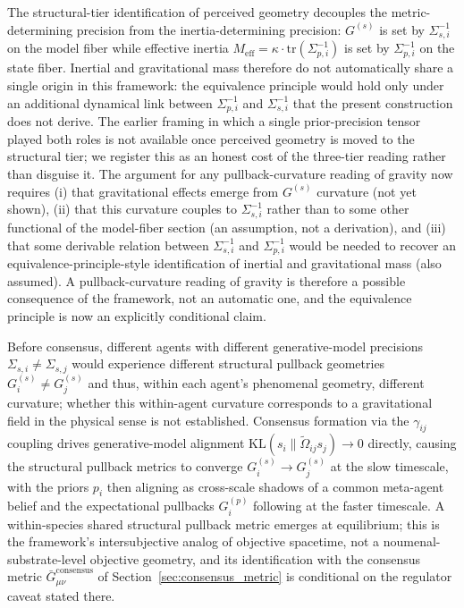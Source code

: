 \documentclass[11pt]{article}
\begin{document}
The structural-tier identification of perceived geometry decouples the metric-determining precision from the inertia-determining precision: $G^{(s)}$ is set by $\Sigma_{s,i}^{-1}$ on the model fiber while effective inertia $M_{\text{eff}} = \kappa \cdot \mathrm{tr}(\Sigma_{p,i}^{-1})$ is set by $\Sigma_{p,i}^{-1}$ on the state fiber. Inertial and gravitational mass therefore do not automatically share a single origin in this framework: the equivalence principle would hold only under an additional dynamical link between $\Sigma_{p,i}^{-1}$ and $\Sigma_{s,i}^{-1}$ that the present construction does not derive. The earlier framing in which a single prior-precision tensor played both roles is not available once perceived geometry is moved to the structural tier; we register this as an honest cost of the three-tier reading rather than disguise it. The argument for any pullback-curvature reading of gravity now requires (i) that gravitational effects emerge from $G^{(s)}$ curvature (not yet shown), (ii) that this curvature couples to $\Sigma_{s,i}^{-1}$ rather than to some other functional of the model-fiber section (an assumption, not a derivation), and (iii) that some derivable relation between $\Sigma_{s,i}^{-1}$ and $\Sigma_{p,i}^{-1}$ would be needed to recover an equivalence-principle-style identification of inertial and gravitational mass (also assumed). A pullback-curvature reading of gravity is therefore a possible consequence of the framework, not an automatic one, and the equivalence principle is now an explicitly conditional claim.

Before consensus, different agents with different generative-model precisions $\Sigma_{s,i} \neq \Sigma_{s,j}$ would experience different structural pullback geometries $G^{(s)}_i \neq G^{(s)}_j$ and thus, within each agent's phenomenal geometry, different curvature; whether this within-agent curvature corresponds to a gravitational field in the physical sense is not established. Consensus formation via the $\gamma_{ij}$ coupling drives generative-model alignment $\mathrm{KL}(s_i\|\tilde\Omega_{ij}s_j) \to 0$ directly, causing the structural pullback metrics to converge $G^{(s)}_i \to G^{(s)}_j$ at the slow timescale, with the priors $p_i$ then aligning as cross-scale shadows of a common meta-agent belief and the expectational pullbacks $G^{(p)}_i$ following at the faster timescale. A within-species shared structural pullback metric emerges at equilibrium; this is the framework's intersubjective analog of objective spacetime, not a noumenal-substrate-level objective geometry, and its identification with the consensus metric $\bar{G}_{\mu\nu}^{\text{consensus}}$ of Section~\ref{sec:consensus_metric} is conditional on the regulator caveat stated there.
\end{document}
